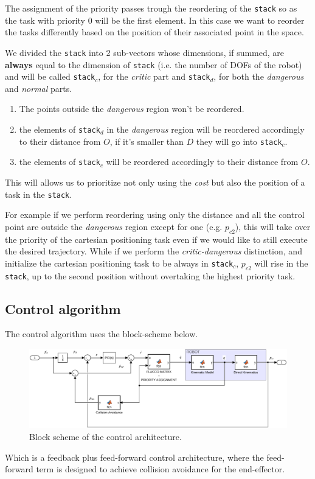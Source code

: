 \documentclass[11pt,a4paper, twocolumn, twoside]{article}
\begin{document}
The assignment of the priority passes trough the reordering of the \texttt{stack} so as the task with priority $0$ will be the first element.
In this case we want to reorder the tasks differently based on the position of their associated point in the space.

We divided the \texttt{stack} into 2 sub-vectors whose dimensions, if summed, are \textbf{always} equal to the dimension of \texttt{stack} (i.e. the number of DOFs of the robot) and will be called \texttt{stack$_c$}, for the \emph{critic} part and \texttt{stack$_d$}, for both the \emph{dangerous} and \emph{normal} parts.

\begin{enumerate}
\item The points outside the \emph{dangerous} region won't be reordered.
\item the elements of \texttt{stack$_d$} in the \emph{dangerous} region will be reordered accordingly to their distance from $O$, if it's smaller than $D$ they will go into \texttt{stack$_c$}.
\item the elements of \texttt{stack$_c$} will be reordered accordingly to their distance from $O$.
\end{enumerate}
This will allows us to prioritize not only using the \emph{cost} but also the position of a task in the \texttt{stack}.

For example if we perform reordering using only the distance and all the control point are outside the \emph{dangerous} region except for one (e.g. $p_{c2}$), this will take over the priority of the cartesian positioning task even if we would like to still execute the desired trajectory. While if we perform the \emph{critic-dangerous} distinction, and initialize the cartesian positioning task to be always in \texttt{stack$_c$}, $p_{c2}$ will rise in the \texttt{stack}, up to the second position without overtaking the highest priority task.
\subsection{Control algorithm}
The control algorithm uses the block-scheme below.
\begin{figure}[t]
\centering
\includegraphics[width = \linewidth]{./plots/ControlSchemeModel.pdf}
\caption{Block scheme of the control architecture.}
\end{figure}
Which is a feedback plus feed-forward control architecture, where the feed-forward term is designed to achieve collision avoidance for the end-effector.
\end{document}
